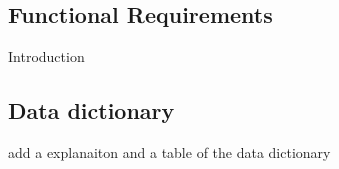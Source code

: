 \subsection{Functional Requirements}
Introduction



\subsection{Data dictionary}
add a explanaiton and a table of the data dictionary
